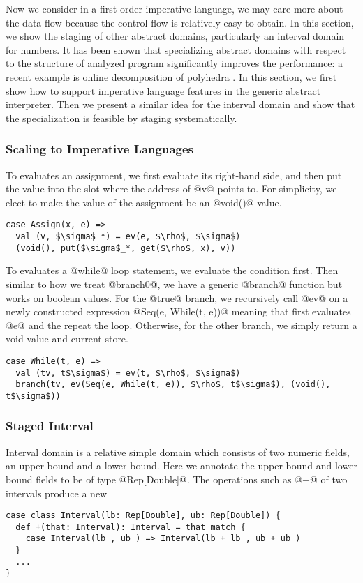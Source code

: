 Now we consider in a first-order imperative language, we may care more about the
data-flow because the control-flow is relatively easy to obtain. In this
section, we show the staging of other abstract domains, particularly an interval
domain for numbers. It has been shown that specializing abstract domains with
respect to the structure of analyzed program significantly improves the
performance: a recent example is online decomposition of polyhedra
\cite{DBLP:conf/popl/SinghPV17, Singh:2017:PCD:3177123.3158143}. In this
section, we first show how to support imperative language features in the
generic abstract interpreter. Then we present a similar idea for the interval
domain and show that the specialization is feasible by staging systematically.

\subsubsection{Scaling to Imperative Languages}

To evaluates an assignment, we first evaluate its right-hand side, and then put
the value into the slot where the address of @v@ points to. For simplicity, we
elect to make the value of the assignment be an @void()@ value.

\begin{lstlisting}
case Assign(x, e) =>
  val (v, $\sigma$_*) = ev(e, $\rho$, $\sigma$)
  (void(), put($\sigma$_*, get($\rho$, x), v))
\end{lstlisting}

To evaluates a @while@ loop statement, we evaluate the condition first. Then
similar to how we treat @branch0@, we have a generic @branch@ function but works
on boolean values. For the @true@ branch, we recursively call @ev@ on a newly
constructed expression @Seq(e, While(t, e))@ meaning that first evaluates @e@
and the repeat the loop. Otherwise, for the other branch, we simply return a
void value and current store.

\begin{lstlisting}
case While(t, e) =>
  val (tv, t$\sigma$) = ev(t, $\rho$, $\sigma$)
  branch(tv, ev(Seq(e, While(t, e)), $\rho$, t$\sigma$), (void(), t$\sigma$))
\end{lstlisting}

\subsubsection{Staged Interval}

Interval domain is a relative simple domain which consists of two numeric
fields, an upper bound and a lower bound. Here we annotate the upper bound and
lower bound fields to be of type @Rep[Double]@. The operations such as @+@ of
two intervals produce a new

\begin{lstlisting}
case class Interval(lb: Rep[Double], ub: Rep[Double]) {
  def +(that: Interval): Interval = that match {
    case Interval(lb_, ub_) => Interval(lb + lb_, ub + ub_)
  }
  ...
}
\end{lstlisting}

\fi
